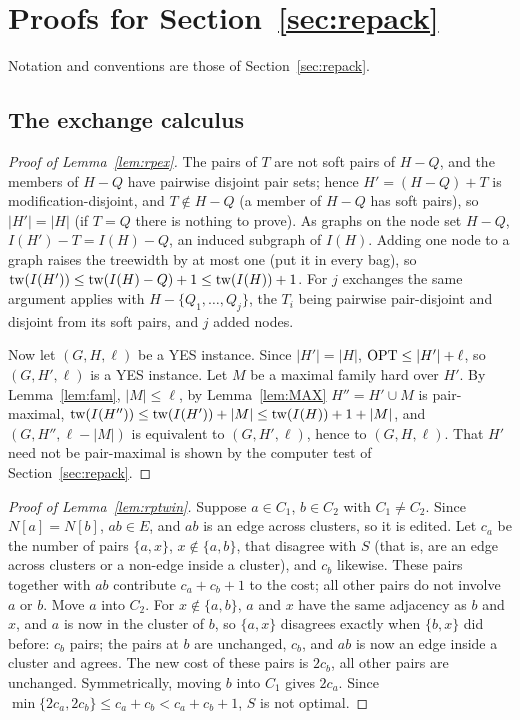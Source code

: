 \section{Proofs for Section~\ref{sec:repack}}\label{app:repack}
Notation and conventions are those of Section~\ref{sec:repack}.

\subsection{The exchange calculus}
\begin{proof}[Proof of Lemma~\ref{lem:rpex}]
The pairs of $T$ are not soft pairs of $H-Q$, and the members of $H-Q$ have pairwise disjoint pair sets; hence $H'=(H-Q)+T$ is modification-disjoint, and $T\notin H-Q$ (a member of $H-Q$ has soft pairs), so $|H'|=|H|$ (if $T=Q$ there is nothing to prove). As graphs on the node set $H-Q$, $I(H')-T=I(H)-Q$, an induced subgraph of $I(H)$. Adding one node to a graph raises the treewidth by at most one (put it in every bag), so $\mathrm{tw}(I(H'))\le\mathrm{tw}(I(H)-Q)+1\le\mathrm{tw}(I(H))+1$. For $j$ exchanges the same argument applies with $H-\{Q_1,\dots,Q_j\}$, the $T_i$ being pairwise pair-disjoint and disjoint from its soft pairs, and $j$ added nodes.

Now let $(G,H,\ell)$ be a YES instance. Since $|H'|=|H|$, $\mathrm{OPT}\le|H'|+\ell$, so $(G,H',\ell)$ is a YES instance. Let $M$ be a maximal family hard over $H'$. By Lemma~\ref{lem:fam}, $|M|\le\ell$, by Lemma~\ref{lem:MAX} $H''=H'\cup M$ is pair-maximal, $\mathrm{tw}(I(H''))\le\mathrm{tw}(I(H'))+|M|\le\mathrm{tw}(I(H))+1+|M|$, and $(G,H'',\ell-|M|)$ is equivalent to $(G,H',\ell)$, hence to $(G,H,\ell)$. That $H'$ need not be pair-maximal is shown by the computer test of Section~\ref{sec:repack}.
\end{proof}

\begin{proof}[Proof of Lemma~\ref{lem:rptwin}]
Suppose $a\in C_1$, $b\in C_2$ with $C_1\ne C_2$. Since $N[a]=N[b]$, $ab\in E$, and $ab$ is an edge across clusters, so it is edited. Let $c_a$ be the number of pairs $\{a,x\}$, $x\notin\{a,b\}$, that disagree with $S$ (that is, are an edge across clusters or a non-edge inside a cluster), and $c_b$ likewise. These pairs together with $ab$ contribute $c_a+c_b+1$ to the cost; all other pairs do not involve $a$ or $b$. Move $a$ into $C_2$. For $x\notin\{a,b\}$, $a$ and $x$ have the same adjacency as $b$ and $x$, and $a$ is now in the cluster of $b$, so $\{a,x\}$ disagrees exactly when $\{b,x\}$ did before: $c_b$ pairs; the pairs at $b$ are unchanged, $c_b$, and $ab$ is now an edge inside a cluster and agrees. The new cost of these pairs is $2c_b$, all other pairs are unchanged. Symmetrically, moving $b$ into $C_1$ gives $2c_a$. Since $\min\{2c_a,2c_b\}\le c_a+c_b<c_a+c_b+1$, $S$ is not optimal.
\end{proof}

